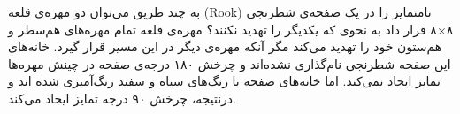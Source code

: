 به چند طریق می‌توان دو مهره‌ی قلعه
(Rook)
نامتمایز را در یک صفحه‌ی شطرنجی ۸×۸ قرار داد به نحوی که یکدیگر را تهدید نکنند؟
مهره‌ی قلعه تمام مهره‌های هم‌سطر و هم‌ستون خود را تهدید می‌کند مگر آنکه مهره‌ی دیگر در
این مسیر قرار گیرد.
خانه‌های این صفحه شطرنجی نام‌گذاری نشده‌اند و چرخش ۱۸۰ درجه‌ی صفحه در چینش مهره‌ها
تمایز ایجاد نمی‌کند. اما خانه‌های صفحه با رنگ‌های سیاه و سفید رنگ‌آمیزی شده اند و
درنتیجه، چرخش ۹۰ درجه تمایز ایجاد می‌کند. 